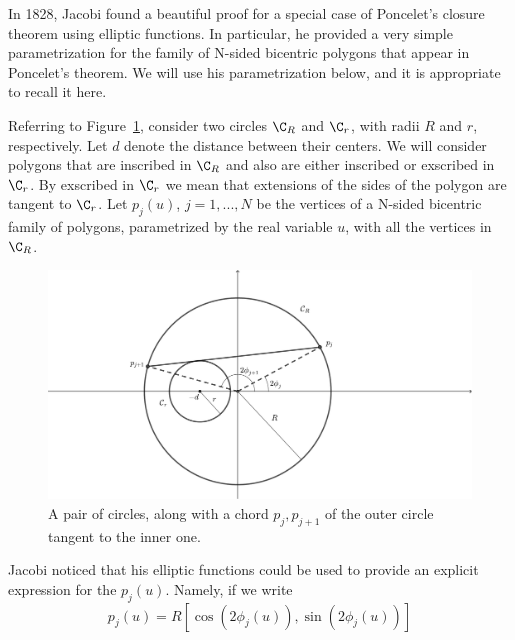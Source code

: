 In 1828, Jacobi found a beautiful proof for a special case of Poncelet's closure theorem using elliptic functions. In particular, he provided a very simple parametrization for the family of N-sided bicentric polygons that appear in Poncelet's theorem. We will use his parametrization below, and it is appropriate to recall it here.

Referring to Figure~\ref{fig:jacobi-nested}, %
consider two circles $\C_{R}$ and $\C_{r}$, with radii $R$ and $r$, respectively. Let $d$ denote the distance between their centers. We will consider polygons that are inscribed in $\C_{R}$ and also are either inscribed or exscribed in $\C_{r}$. By exscribed in $\C_{r}$ we mean that extensions of the sides of the polygon are tangent to $\C_{r}$. Let $p_{j}(u)$, $j=1,...,N$ be the vertices of a N-sided bicentric family of polygons, parametrized by the real variable $u$, with all the vertices in $\C_{R}$.

\begin{figure}
    \centering
    \includegraphics[width=.8\textwidth]{pics_04/0110_inscribed.pdf}
    \caption{A pair of circles, along with a chord $p_j,p_{j+1}$ of the outer circle tangent to the inner one.}
    \label{fig:jacobi-nested}
\end{figure}


Jacobi noticed that his elliptic functions could be used to provide an explicit expression for the $p_{j}(u)$. Namely, if we write
\begin{equation}
\label{jacobivertex}  
p_{j}(u)=R\left[ \cos{(2\phi_{j}(u))}, \sin{(2\phi_{j}(u))}\right]
\end{equation}

